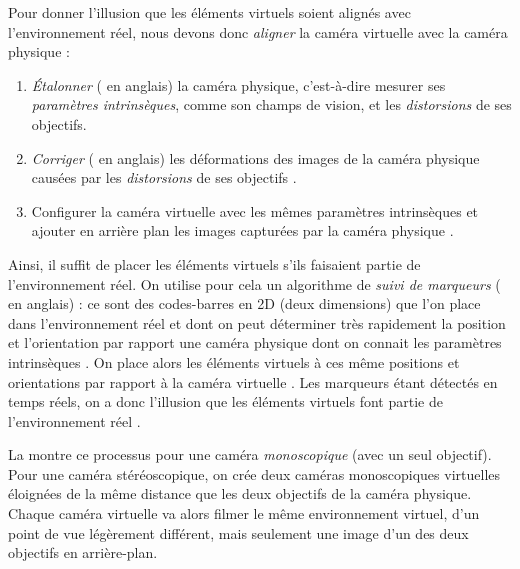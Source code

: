 Pour donner l'illusion que les éléments virtuels soient alignés avec l'environnement réel, nous devons donc \emph{aligner} la caméra virtuelle avec la caméra physique :
\begin{enumerate}
  \item \emph{Étalonner} ( en anglais) la caméra physique, c'est-à-dire mesurer ses \emph{paramètres intrinsèques}, comme son champs de vision, et les \emph{distorsions} de ses objectifs.
  \item \emph{Corriger} ( en anglais) les déformations des images de la caméra physique causées par les \emph{distorsions} de ses objectifs .
  \item Configurer la caméra virtuelle avec les mêmes paramètres intrinsèques et ajouter en arrière plan les images capturées par la caméra physique .
\end{enumerate}

Ainsi, il suffit de placer les éléments virtuels s'ils faisaient partie de l'environnement réel. On utilise pour cela un algorithme de \emph{suivi de marqueurs} ( en anglais) : ce sont des codes-barres en 2D (deux dimensions) que l'on place dans l'environnement réel  et dont on peut déterminer très rapidement la position et l'orientation par rapport une caméra physique dont on connait les paramètres intrinsèques \cite{Garrido-Jurado2014}. On place alors les éléments virtuels à ces même positions et orientations par rapport à la caméra virtuelle . Les marqueurs étant détectés en temps réels, on a donc l'illusion que les éléments virtuels font partie de l'environnement réel .

La  montre ce processus pour une caméra \emph{monoscopique} (avec un seul objectif). Pour une caméra stéréoscopique, on crée deux caméras monoscopiques virtuelles éloignées de la même distance que les deux objectifs de la caméra physique. Chaque caméra virtuelle va alors filmer le même environnement virtuel, d'un point de vue légèrement différent, mais seulement une image d'un des deux objectifs en arrière-plan.

